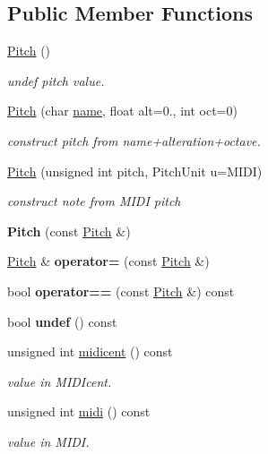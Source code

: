 \subsection*{Public Member Functions}
\begin{DoxyCompactItemize}
\item 
\mbox{\hyperlink{group__segment_ga09a5f5040f1902afa6d81520cf7bd084}{Pitch}} ()
\begin{DoxyCompactList}\small\item\em undef pitch value. \end{DoxyCompactList}\item 
\mbox{\hyperlink{group__segment_gaf3f9d88915bb6688d522f09d7542f690}{Pitch}} (char \mbox{\hyperlink{classPitch_a7a7649ed78c05c1ff5f77c69155f1a71}{name}}, float alt=0., int oct=0)
\begin{DoxyCompactList}\small\item\em construct pitch from name+alteration+octave. \end{DoxyCompactList}\item 
\mbox{\hyperlink{group__segment_gaace1762f4d975560a8d739d2d13fcd9b}{Pitch}} (unsigned int pitch, Pitch\+Unit u=M\+I\+DI)
\begin{DoxyCompactList}\small\item\em construct note from M\+I\+DI pitch \end{DoxyCompactList}\item 
{\bfseries Pitch} (const \mbox{\hyperlink{classPitch}{Pitch}} \&)
\item 
\mbox{\hyperlink{classPitch}{Pitch}} \& {\bfseries operator=} (const \mbox{\hyperlink{classPitch}{Pitch}} \&)
\item 
bool {\bfseries operator==} (const \mbox{\hyperlink{classPitch}{Pitch}} \&) const
\item 
\mbox{\label{classPitch_a3d0bc9b824e12c9036b238c52a1ce16f}} 
bool {\bfseries undef} () const
\item 
\mbox{\label{classPitch_aa574b5a09e7eb950903e217ca843f5d3}} 
unsigned int \mbox{\hyperlink{classPitch_aa574b5a09e7eb950903e217ca843f5d3}{midicent}} () const
\begin{DoxyCompactList}\small\item\em value in M\+I\+D\+Icent. \end{DoxyCompactList}\item 
\mbox{\label{classPitch_adee54af3f8f7dccc618a5bd585b43dad}} 
unsigned int \mbox{\hyperlink{classPitch_adee54af3f8f7dccc618a5bd585b43dad}{midi}} () const
\begin{DoxyCompactList}\small\item\em value in M\+I\+DI. \end{DoxyCompactList}\end{DoxyCompactItemize}

